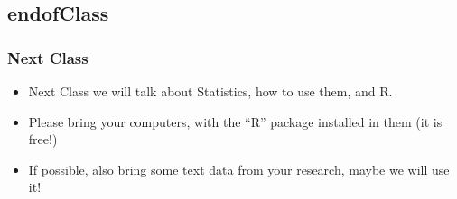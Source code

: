 \documentclass{beamer}
\begin{document}
\subsection{endofClass}
\begin{frame}
  \frametitle{Next Class}
  \begin{itemize}
  \item Next Class we will talk about Statistics, how to use them, and
    R.
  \item Please bring your computers, with the ``R'' package installed
    in them (it is free!)
  \item If possible, also bring some text data from your research,
    maybe we will use it!
  \end{itemize}
\end{frame}
\end{document}

